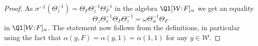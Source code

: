 \documentclass[eqthmnum,nocolour,skinny]{jt-calcs}
\newcommand\sd{
	\mathchoice{\mkern1.5mu}{\mkern1.5mu}{}{}%
	{:}%
	\mathchoice{\mkern1.5mu}{\mkern1.5mu}{}{}
}
\begin{document}
\begin{proof}
As $\sigma^{-1}(\Theta_z^{-1}) = \Theta_F\Theta_z^{-1}\Theta_F^{-1}$ in the algebra $\Ql[\mathcal{W}\sd F]_{\alpha}$ we get an equality
\begin{equation*}
\Theta_z\Theta_x^{-1}\Theta_F\Theta_z^{-1} = \omega \Theta_w^{-1}\Theta_F
\end{equation*}
in $\Ql[\mathcal{W}\sd F]_{\alpha}$. The statement now follows from the definitions, in particular using the fact that $\alpha(y,F) = \alpha(y,1) = \alpha(1,1)$ for any $y \in \mathcal{W}$.
%
\end{proof}
\end{document}
